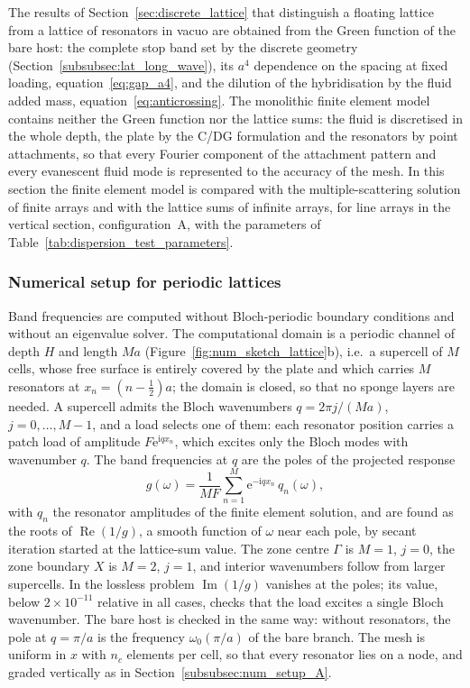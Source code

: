 {The results of Section~\ref{sec:discrete_lattice} that distinguish a floating lattice from a lattice of resonators in vacuo are obtained from the Green function of the bare host: the complete stop band set by the discrete geometry (Section~\ref{subsubsec:lat_long_wave}), its $a^4$ dependence on the spacing at fixed loading, equation~\eqref{eq:gap_a4}, and the dilution of the hybridisation by the fluid added mass, equation~\eqref{eq:anticrossing}. The monolithic finite element model contains neither the Green function nor the lattice sums: the fluid is discretised in the whole depth, the plate by the C/DG formulation and the resonators by point attachments, so that every Fourier component of the attachment pattern and every evanescent fluid mode is represented to the accuracy of the mesh. In this section the finite element model is compared with the multiple-scattering solution of finite arrays and with the lattice sums of infinite arrays, for line arrays in the vertical section, configuration~A, with the parameters of Table~\ref{tab:dispersion_test_parameters}.

\subsubsection{Numerical setup for periodic lattices}\label{subsubsec:num_setup_lattice}

Band frequencies are computed without Bloch-periodic boundary conditions and without an eigenvalue solver. The computational domain is a periodic channel of depth $H$ and length $Ma$ (Figure~\ref{fig:num_sketch_lattice}b), i.e.\ a supercell of $M$ cells, whose free surface is entirely covered by the plate and which carries $M$ resonators at $x_n=(n-\tfrac12)a$; the domain is closed, so that no sponge layers are needed. A supercell admits the Bloch wavenumbers $q=2\pi j/(Ma)$, $j=0,\ldots,M-1$, and a load selects one of them: each resonator position carries a patch load of amplitude $F\mathrm{e}^{\mathrm{i}qx_n}$, which excites only the Bloch modes with wavenumber $q$. The band frequencies at $q$ are the poles of the projected response
\begin{equation}\label{eq:num_bloch_response}
    g(\omega)=\frac{1}{MF}\sum_{n=1}^{M}\mathrm{e}^{-\mathrm{i}qx_n}\,q_n(\omega),
\end{equation}
with $q_n$ the resonator amplitudes of the finite element solution, and are found as the roots of $\operatorname{Re}(1/g)$, a smooth function of $\omega$ near each pole, by secant iteration started at the lattice-sum value. The zone centre $\Gamma$ is $M=1$, $j=0$, the zone boundary $X$ is $M=2$, $j=1$, and interior wavenumbers follow from larger supercells. In the lossless problem $\operatorname{Im}(1/g)$ vanishes at the poles; its value, below $2\times10^{-11}$ relative in all cases, checks that the load excites a single Bloch wavenumber. The bare host is checked in the same way: without resonators, the pole at $q=\pi/a$ is the frequency $\omega_0(\pi/a)$ of the bare branch. The mesh is uniform in $x$ with $n_c$ elements per cell, so that every resonator lies on a node, and graded vertically as in Section~\ref{subsubsec:num_setup_A}.

}
